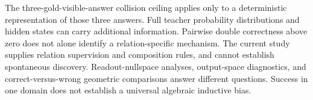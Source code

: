 \documentclass[11pt]{article}
\begin{document}
The three-gold-visible-answer collision ceiling applies only to a deterministic representation of those three answers. Full teacher probability distributions and hidden states can carry additional information. Pairwise double correctness above zero does not alone identify a relation-specific mechanism. The current study supplies relation supervision and composition rules, and cannot establish spontaneous discovery. Readout-nullspace analyses, output-space diagnostics, and correct-versus-wrong geometric comparisons answer different questions. Success in one domain does not establish a universal algebraic inductive bias.





\end{document}
